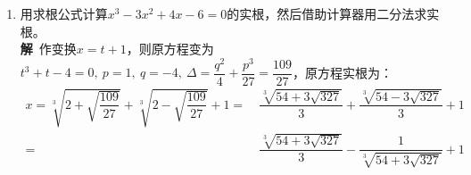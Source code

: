 \begin{enumerate}[label={【\textbf{例\thechapter.\arabic*}】},
 leftmargin=\inteval{\myenumleftmargin}pt,
 itemsep=\inteval{\myenumitempsep}pt,
 itemindent=\inteval{\myenumitemindent}pt]
%
因为$ \cos f(x+T)=\cos f(x) $，所以必有
\begin{gather} \label{2015上海解法二1}
    f(x+T)= f(x) +2k\pi,\q k\in \textbf{N}^+ 
\end{gather}
或者
\begin{gather}\label{2015上海解法二2}
    f(x+T)= 2k\pi-f(x),\q k\in \textbf{N}^+
\end{gather}
因为(\ref{2015上海解法二2})式左侧关于$ x $单调递增，
右侧关于$ x $单调递减，矛盾，所以(\ref{2015上海解法二2})式
不可能成立。

在(\ref{2015上海解法二1})式中令$ x=0 $可得：$ f(T)=f(0)+2k\pi $，
所以$ k=2 $，
\begin{gather*}
    f(x+T)=f(x)+4\pi=f(x)+f(T)
\end{gather*}

是否可能出现如下情况呢？比如存在$ t\in(0,T) $，
存在$ x_1\in(0,t),x_2\in (t,T) $，使得
\begin{align}
    f(x_1+T) &= f(x_1) +2k_1\pi,\q k_1\in \textbf{N}^+ \label{2015上海解法二3}  \\
    f(x_2+T) &= f(x_2) +2k_2\pi,\q k_2\in \textbf{N}^+ \label{2015上海解法二4}
\end{align}
其中$ k_1\neq k_2 $. 
回答是不可能。假如(\ref{2015上海解法二3}),(\ref{2015上海解法二4})
两式都成立，那么在$ x=t+T $处，$ f(x) $的左右极限不相等。
又因为$ f(x) $是单调递增的，说明$ f(x) $在$ x=t+T $处出现了一个
向上的跳跃(或称“间断”)，此时，$ f(x) $的值域就达不到\textbf{R}，
与题意矛盾。证毕。\\
\textbf{注}：$ f(x+T)=f(x)+f(T) $与正比例函数的函数方程
$ f(x+y)=f(x)+f(y) $很相似，但我们并不能得出$ f(x) $
在$ (0,T) $上是正比例函数的结论，因为$ T $是固定的，而
$ y $是任意的。只能得出如下结论：
$ f(x) $在$ (T,2T) $上的图像是由$ f(x) $在$ (0,T) $
上的图像向右平移$ T $，再向上平移$ f(T)=2k\pi $得到的。
其它区间类似。比如$ f(x) $的一种可能的图像如下：
\begin{figure}[!ht]
    \centering
    \texttt{[image: 2015上海高考]}
\end{figure}

\item 用求根公式计算$ x^3-3x^2+4x-6=0 $的实根，然后借助计算器用二分法求实根。\\
\textbf{解}\ 作变换$ x=t+1 $，则原方程变为$ t^3+t-4=0,\ p=1,\ q=-4,\ 
\Delta=\dfrac{q^2}{4}+\dfrac{p^3}{27}=\dfrac{109}{27} $，原方程实根为：
\begin{align*}
    x =\sqrt[3]{2+\sqrt{\dfrac{109}{27}}}+\sqrt[3]{2-\sqrt{\dfrac{109}{27}}}+1  
    =&\  \dfrac{\sqrt[3]{54+3\sqrt{327}}}{3}+\dfrac{\sqrt[3]{54-3\sqrt{327}}}{3}+1 \\
    =&\  \dfrac{\sqrt[3]{54+3\sqrt{327}}}{3}-\dfrac{1}{\sqrt[3]{54+3\sqrt{327}}}+1
\end{align*}


\end{enumerate}
